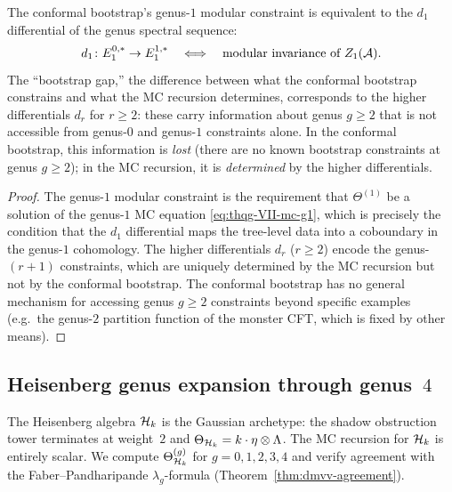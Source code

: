 \begin{proposition}
\label{prop:thqg-VII-bootstrap-gap}
\ClaimStatusProvedHere
The conformal bootstrap's genus-$1$ modular constraint is
equivalent to the $d_1$ differential of the genus spectral
sequence:
\begin{equation}\label{eq:thqg-VII-bootstrap-gap}
d_1 \colon E_1^{0,*} \to E_1^{1,*}
\quad\Longleftrightarrow\quad
\text{modular invariance of } Z_1(\mathcal{A}).
\end{equation}
The ``bootstrap gap,'' the difference between what the
conformal bootstrap constrains and what the MC recursion
determines, corresponds to the higher differentials
$d_r$ for $r \geq 2$: these carry information about genus
$g \geq 2$ that is not accessible from genus-$0$ and genus-$1$
constraints alone. In the conformal bootstrap, this information
is \emph{lost} (there are no known bootstrap constraints at
genus $g \geq 2$); in the MC recursion, it is
\emph{determined} by the higher differentials.
\end{proposition}

\begin{proof}
The genus-$1$ modular constraint is the requirement that
$\Theta^{(1)}$ be a solution of the genus-$1$ MC equation
\eqref{eq:thqg-VII-mc-g1}, which is precisely the condition
that the $d_1$ differential maps the tree-level data into a
coboundary in the genus-$1$ cohomology. The higher differentials
$d_r$ ($r \geq 2$) encode the genus-$(r{+}1)$ constraints, which
are uniquely determined by the MC recursion but not by the
conformal bootstrap. The conformal bootstrap has no general
mechanism for accessing genus $g \geq 2$ constraints beyond
specific examples (e.g.\ the genus-$2$ partition function
of the monster CFT, which is fixed by other means).
\end{proof}

%
%

\subsection{Heisenberg genus expansion through genus~$4$}
\label{subsec:thqg-VII-heisenberg-genus4}

The Heisenberg algebra $\mathcal{H}_k$ is the Gaussian archetype:
the shadow obstruction tower terminates at weight~$2$ and
$\Theta_{\mathcal{H}_k} = k \cdot \eta \otimes \Lambda$. The MC
recursion for $\mathcal{H}_k$ is entirely scalar. We compute
$\Theta^{(g)}_{\mathcal{H}_k}$ for $g = 0, 1, 2, 3, 4$ and verify
agreement with the Faber--Pandharipande $\lambda_g$-formula
(Theorem~\ref{thm:dmvv-agreement}).

